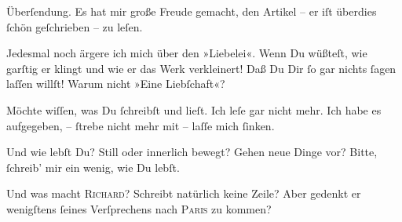                Überſendung. Es hat mir große Freude gemacht, den Artikel – er iſt überdies ſchön geſchrieben – zu leſen.\pend
           
\pstart
           Jedesmal noch ärgere ich mich über den \label{K_L02729-6v}\label{K_L02729-6} »Liebelei«. Wenn Du wüßteſt, wie garſtig
               er  klingt und wie er das Werk verkleinert! {\pb}Daß Du Dir ſo gar nichts ſagen laſſen willſt! Warum
               nicht »Eine Liebſchaft«?\pend
           
\pstart
           Möchte wiſſen, was Du ſchreibſt und lieſt. Ich leſe gar nicht mehr. Ich habe es
               aufgegeben, – ſtrebe nicht mehr mit – laſſe mich ſinken.\pend
           
\pstart
           Und wie lebſt Du? Still oder innerlich bewegt? Gehen neue Dinge vor? Bitte, ſchreib’
               mir ein wenig, wie Du lebſt.\pend
           
\pstart
           Und was macht \textsc{Richard}? Schreibt natürlich keine Zeile? Aber gedenkt {\pb}er wenigſtens ſeines Verſprechens nach \textsc{Paris} zu kommen?\pend
           
